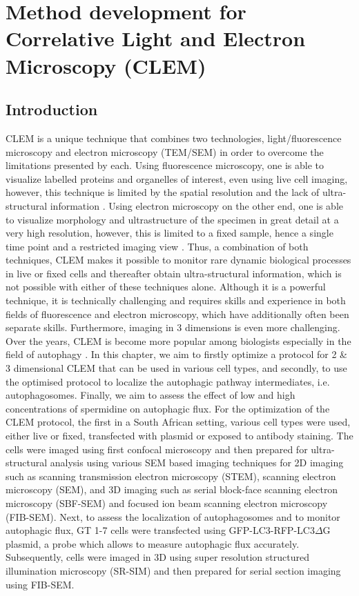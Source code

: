 \chapter{Method development for Correlative Light and Electron Microscopy (CLEM)}
\label{sec:chapter6}
\section{Introduction}
CLEM is a unique technique that combines two technologies, light/fluorescence microscopy and electron microscopy (TEM/SEM) in order to overcome the limitations presented by each. Using fluorescence microscopy, one is able to visualize labelled proteins and organelles of interest, even using live cell imaging, however, this technique is limited by the spatial resolution and the lack of ultra-structural information \citep{Russell2017}. Using electron microscopy on the other end, one is able to visualize morphology and ultrastructure of the specimen in great detail at a very high resolution, however, this is limited to a fixed sample, hence a single time point and a restricted imaging view \citep{Liss2016,Russell2017}. Thus, a combination of both techniques, CLEM makes it possible to monitor rare dynamic biological processes in live or fixed cells and thereafter obtain ultra-structural information, which is not possible with either of these techniques alone. Although it is a powerful technique, it is technically challenging and requires skills and experience in both fields of fluorescence and electron microscopy, which have additionally often been separate skills. Furthermore, imaging in 3 dimensions is even more challenging. Over the years, CLEM is become more popular among biologists especially in the field of autophagy \citep{Duke2014,Hosseini2014, Russell2017,Gudmundsson2019}. In this chapter, we aim to firstly optimize a protocol for 2 \& 3 dimensional CLEM that can be used in various cell types, and secondly, to use the optimised protocol to localize the autophagic pathway intermediates, i.e. autophagosomes. Finally, we aim to assess the effect of low and high concentrations of spermidine on autophagic flux. For the optimization of the CLEM protocol, the first in a South African setting, various cell types were used, either live or fixed, transfected with plasmid or exposed to antibody staining. The cells were imaged using first confocal microscopy and then prepared for ultra-structural analysis using various SEM based imaging techniques for 2D imaging such as scanning transmission electron microscopy (STEM), scanning electron microscopy (SEM), and 3D imaging such as serial block-face scanning electron microscopy (SBF-SEM) and focused ion beam scanning electron microscopy (FIB-SEM). Next, to assess the localization of autophagosomes and to monitor autophagic flux, GT 1-7 cells were transfected using GFP-LC3-RFP-LC3$\Delta$G plasmid, a probe which allows to measure autophagic flux accurately. Subsequently, cells were imaged in 3D using super resolution structured illumination microscopy (SR-SIM) and then prepared for serial section imaging using FIB-SEM. 


